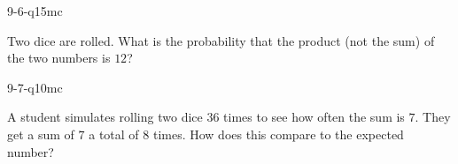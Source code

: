 \begin{practiceQuestion}{9-6-q15}{mc}
\begin{questionText}
Two dice are rolled. What is the probability that the product (not the sum) of the two numbers is $12$?
\end{questionText}
\end{practiceQuestion}

\begin{practiceQuestion}{9-7-q10}{mc}
\begin{questionText}
A student simulates rolling two dice $36$ times to see how often the sum is $7$. They get a sum of $7$ a total of $8$ times. How does this compare to the expected number?
\end{questionText}
\end{practiceQuestion}
